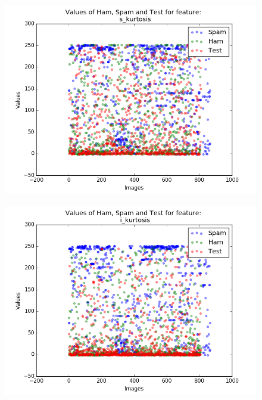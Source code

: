 \begin{figure}[h]
	\centering
	\begin{minipage}{.5\textwidth}
		\centering
		\includegraphics[width=\linewidth]{images/appA/s_kurtosis_values_scatter}
		\label{fig:s_kurtosis_values_scatter}
	\end{minipage}%
	\begin{minipage}{.5\textwidth}
		\centering
		\includegraphics[width=\linewidth]{images/appA/i_kurtosis_values_scatter}
		\label{fig:i_kurtosis_values_scatter}
	\end{minipage}
\end{figure}




